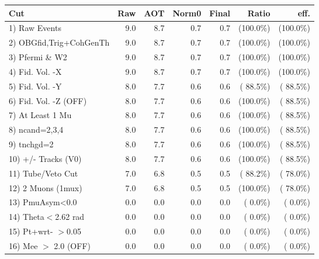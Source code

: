  \begin{table}[h!]\centering
 \begin{tabular}{||l||r|r|r|r|r|r||}
 \hline
 \hline
 Cut & Raw & AOT & Norm0 & Final & Ratio & eff.       \\
 \hline
  1) Raw Events           &          9.0 &          8.7 &          0.7 &          0.7 & (100.0\%) & (100.0\%) \\
  2) OBGfid,Trig+CohGenTh &          9.0 &          8.7 &          0.7 &          0.7 & (100.0\%) & (100.0\%) \\
  3) Pfermi \& W2         &          9.0 &          8.7 &          0.7 &          0.7 & (100.0\%) & (100.0\%) \\
  4) Fid. Vol. -X         &          9.0 &          8.7 &          0.7 &          0.7 & (100.0\%) & (100.0\%) \\
  5) Fid. Vol. -Y         &          8.0 &          7.7 &          0.6 &          0.6 & ( 88.5\%) & ( 88.5\%) \\
  6) Fid. Vol. -Z (OFF)   &          8.0 &          7.7 &          0.6 &          0.6 & (100.0\%) & ( 88.5\%) \\
  7) At Least 1 Mu        &          8.0 &          7.7 &          0.6 &          0.6 & (100.0\%) & ( 88.5\%) \\
  8) ncand=2,3,4          &          8.0 &          7.7 &          0.6 &          0.6 & (100.0\%) & ( 88.5\%) \\
  9) tnchgd=2             &          8.0 &          7.7 &          0.6 &          0.6 & (100.0\%) & ( 88.5\%) \\
 10) +/- Tracks (V0)      &          8.0 &          7.7 &          0.6 &          0.6 & (100.0\%) & ( 88.5\%) \\
 11) Tube/Veto Cut        &          7.0 &          6.8 &          0.5 &          0.5 & ( 88.2\%) & ( 78.0\%) \\
 12) 2 Muons (1mux)       &          7.0 &          6.8 &          0.5 &          0.5 & (100.0\%) & ( 78.0\%) \\
 13) PmuAsym<0.0          &          0.0 &          0.0 &          0.0 &          0.0 & (  0.0\%) & (  0.0\%) \\
 14) Theta$<$2.62 rad     &          0.0 &          0.0 &          0.0 &          0.0 & (  0.0\%) & (  0.0\%) \\
 15) Pt+wrt- $>$0.05      &          0.0 &          0.0 &          0.0 &          0.0 & (  0.0\%) & (  0.0\%) \\
 16) Mee $>$ 2.0  (OFF)   &          0.0 &          0.0 &          0.0 &          0.0 & (  0.0\%) & (  0.0\%) \\

\end{tabular}
\end{table}
